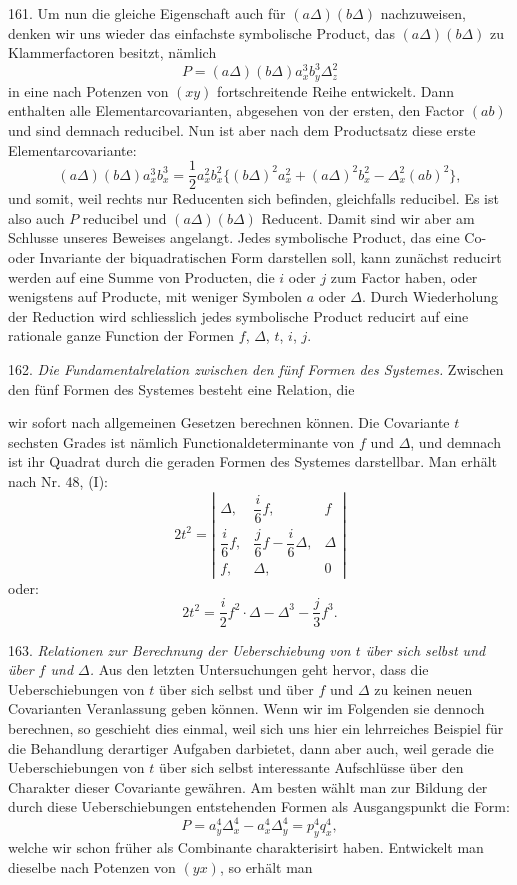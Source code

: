 \documentclass[11pt]{article}
\providecommand{\weberpage}[1]{}
\let\Delta\varDelta
\begin{document}
161. Um nun die gleiche Eigenschaft auch für $(a\Delta)(b\Delta)$ nachzuweisen, denken wir uns wieder das einfachste symbolische Product, das $(a\Delta)(b\Delta)$ zu Klammerfactoren besitzt, nämlich
\[
P = (a\Delta)(b\Delta)a_x^3 b_y^3 \Delta_z^2
\]
in eine nach Potenzen von $(xy)$ fortschreitende Reihe entwickelt. Dann enthalten alle Elementarcovarianten, abgesehen von der ersten, den Factor $(ab)$ und sind demnach reducibel. Nun ist aber nach dem Productsatz diese erste Elementarcovariante:
\[
(a\Delta)(b\Delta)a_x^3 b_x^3 = \frac{1}{2} a_x^2 b_x^2 \{(b\Delta)^2 a_x^2 + (a\Delta)^2 b_x^2 - \Delta_x^2(ab)^2\},
\]
und somit, weil rechts nur Reducenten sich befinden, gleichfalls reducibel. Es ist also auch $P$ reducibel und $(a\Delta)(b\Delta)$ Reducent. Damit sind wir aber am Schlusse unseres Beweises angelangt. Jedes symbolische Product, das eine Co- oder Invariante der biquadratischen Form darstellen soll, kann zunächst reducirt werden auf eine Summe von Producten, die $i$ oder $j$ zum Factor haben, oder wenigstens auf Producte, mit weniger Symbolen $a$ oder $\Delta$. Durch Wiederholung der Reduction wird schliesslich jedes symbolische Product reducirt auf eine rationale ganze Function der Formen $f$, $\Delta$, $t$, $i$, $j$.

162. \textit{Die Fundamentalrelation zwischen den fünf Formen des Systemes.} Zwischen den fünf Formen des Systemes besteht eine Relation, die


\weberpage{183}

wir sofort nach allgemeinen Gesetzen berechnen können. Die Covariante $t$ sechsten Grades ist nämlich Functionaldeterminante von $f$ und $\Delta$, und demnach ist ihr Quadrat durch die geraden Formen des Systemes darstellbar. Man erhält nach Nr. 48, (I):
\[
2t^2 = \left|
\begin{array}{ccc}
\Delta, & \dfrac{i}{6} f, & f \\[4pt]
\dfrac{i}{6} f, & \dfrac{j}{6} f - \dfrac{i}{6}\Delta, & \Delta \\[4pt]
f, & \Delta, & 0
\end{array}
\right|
\]
oder:
\[
2t^2 = \frac{i}{2} f^2 \cdot \Delta - \Delta^3 - \frac{j}{3} f^3.
\]

163. \textit{Relationen zur Berechnung der Ueberschiebung von $t$ über sich selbst und über $f$ und $\Delta$.} Aus den letzten Untersuchungen geht hervor, dass die Ueberschiebungen von $t$ über sich selbst und über $f$ und $\Delta$ zu keinen neuen Covarianten Veranlassung geben können. Wenn wir im Folgenden sie dennoch berechnen, so geschieht dies einmal, weil sich uns hier ein lehrreiches Beispiel für die Behandlung derartiger Aufgaben darbietet, dann aber auch, weil gerade die Ueberschiebungen von $t$ über sich selbst interessante Aufschlüsse über den Charakter dieser Covariante gewähren. Am besten wählt man zur Bildung der durch diese Ueberschiebungen entstehenden Formen als Ausgangspunkt die Form:
\[
P = a_y^4 \Delta_x^4 - a_x^4 \Delta_y^4 = p_y^4 q_x^4,
\]
welche wir schon früher als Combinante charakterisirt haben. Entwickelt man dieselbe nach Potenzen von $(yx)$, so erhält man
\end{document}

